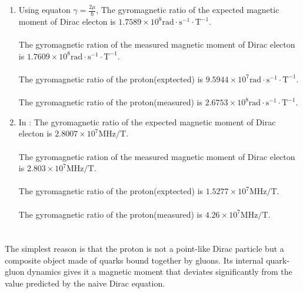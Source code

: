 \documentclass[11pt]{article}
\begin{document}
\section{}
\begin{enumerate}[label=\alph*)]
    \item 
        Using equaton $\gamma = \frac{2\mu}{\hbar} $, The gyromagnetic ratio of the expected magnetic moment of Dirac electon is $1.7589 \times10^{8} \text{rad} \cdot \text{s}^{-1} \cdot \text{T}^{-1}$.\\
        \\
        The gyromagnetic ration of the measured magnetic moment of Dirac electon is $1.7609 \times10^{8} \text{rad} \cdot \text{s}^{-1} \cdot \text{T}^{-1}$.\\ 
        \\
        The gyromagnetic ratio of the proton(exptected) is $9.5944 \times10^{7} \text{rad} \cdot \text{s}^{-1} \cdot \text{T}^{-1}$.\\
        \\
        The gyromagnetic ratio of the proton(measured) is $2.6753 \times10^{8} \text{rad} \cdot \text{s}^{-1} \cdot \text{T}^{-1}$.\\
    \item In :
        The gyromagnetic ratio of the expected magnetic moment of Dirac electon is $2.8007 \times10^{7} \text{MHz/T}$.\\
        \\
        The gyromagnetic ration of the measured magnetic moment of Dirac electon is $2.803 \times10^{7} \text{MHz/T}.$\\ 
        \\
        The gyromagnetic ratio of the proton(exptected) is $1.5277 \times10^{7} \text{MHz/T}.$\\
        \\
        The gyromagnetic ratio of the proton(measured) is $4.26 \times10^{7} \text{MHz/T}$.\\
\end{enumerate}

\section{}
    The simplest reason is that the proton is not a point-like Dirac particle but a composite object made of quarks bound together by gluons. Its internal quark-gluon dynamics gives it a magnetic moment that deviates significantly from the value predicted by the naive Dirac equation.
\end{document}

